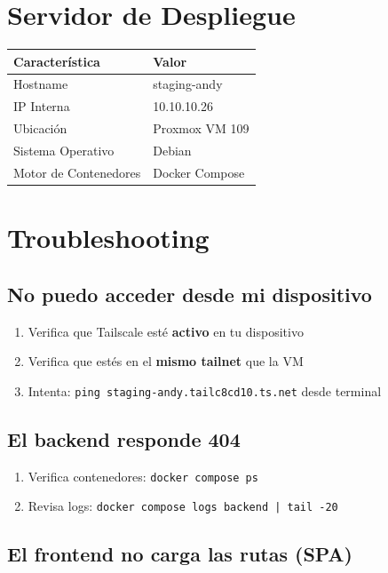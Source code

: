 \documentclass[11pt]{article}
\begin{document}
\section{Servidor de Despliegue}

\begin{table}[h]
\centering
\begin{tabular}{|l|l|}
\hline
\textbf{Característica} & \textbf{Valor} \\
\hline
Hostname & staging-andy \\
\hline
IP Interna & 10.10.10.26 \\
\hline
Ubicación & Proxmox VM 109 \\
\hline
Sistema Operativo & Debian \\
\hline
Motor de Contenedores & Docker Compose \\
\hline
\end{tabular}
\end{table}

\section{Troubleshooting}

\subsection{No puedo acceder desde mi dispositivo}

\begin{enumerate}
\item Verifica que Tailscale esté \textbf{activo} en tu dispositivo
\item Verifica que estés en el \textbf{mismo tailnet} que la VM
\item Intenta: \texttt{ping staging-andy.tailc8cd10.ts.net} desde terminal
\end{enumerate}

\subsection{El backend responde 404}

\begin{enumerate}
\item Verifica contenedores: \texttt{docker compose ps}
\item Revisa logs: \texttt{docker compose logs backend | tail -20}
\end{enumerate}

\subsection{El frontend no carga las rutas (SPA)}
\end{document}

